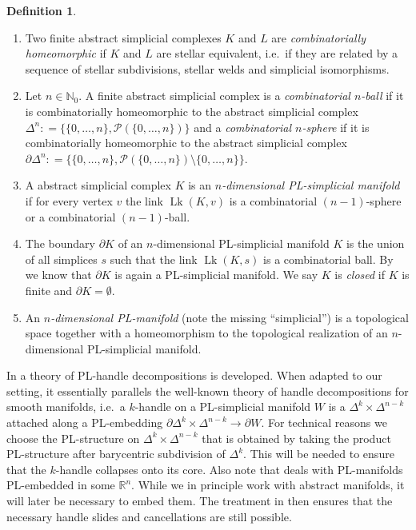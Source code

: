 \documentclass[a4paper, reqno]{amsart}
\theoremstyle{definition}
\newtheorem{definition}[proposition]{Definition}
\theoremstyle{remark}
\newcommand{\N}{\mathbb{N}}
\newcommand{\R}{\mathbb{R}}
\def\op{\operatorname}
\newcommand{\defeq}{\mathrel{\mathop:}=}
\renewcommand{\~}{\nobreak\ }
\begin{document}
\begin{definition}\label{def:combinatorial-manifold}\hfill
\begin{enumerate}
\item Two finite abstract simplicial complexes $K$ and $L$ are \emph{combinatorially homeomorphic} if $K$ and $L$ are stellar equivalent, i.e.\ if they are related by  a sequence of stellar subdivisions, stellar welds and simplicial isomorphisms. 
\item Let $n\in \N_0$. 
 A finite abstract simplicial complex is a 
\emph{combinatorial $n$-ball} if it is combinatorially homeomorphic to the abstract simplicial complex \mbox{$\Delta^n\defeq\{\{0,\dots,n\},\mathcal{P}(\{0,\dots,n\})\}$} and a 
\emph{combinatorial $n$-sphere} if it is combinatorially homeomorphic to the abstract simplicial complex $\partial \Delta^n\defeq\{\{0,\dots,n\},\mathcal{P}(\{0,\dots,n\})\setminus \{0,\dots,n\}\}$. 
\item A abstract simplicial complex $K$ is an \emph{$n$-dimensional \mbox{PL-simplicial} manifold} if for every vertex $v$ the link $\op{Lk}(K,v)$ is a combinatorial $(n-1)$-sphere or a combinatorial $(n-1)$-ball.
\item The boundary $\partial K$ of an $n$-di\-men\-sional PL-simplicial manifold $K$ is the union of all simplices $s$ such that  the link $\op{Lk}(K,s)$ is a combinatorial ball. By \cite[Corollary\~II.4]{Glaser} we know that $\partial K$ is again a PL-simplicial manifold.
We say $K$ is \emph{closed} if $K$ is finite and $\partial K=\emptyset$.
\item An \emph{$n$-dimensional PL-manifold} (note the missing \enquote{simplicial}) is a topological space together with a homeomorphism to the topological realization of an $n$-dimensional PL-simplicial manifold.
\end{enumerate}
\end{definition}




In \cite[Chapter 6]{rourkesandersonnew} a theory of PL-handle decompositions is developed. When adapted to our setting, it essentially parallels the well-known theory of handle decompositions for smooth manifolds, i.e.\ a $k$-handle on a PL-simplicial manifold $W$ is a $\Delta^k\times\Delta^{n-k}$ attached along a \mbox{PL-embedding} $\partial\Delta^k\times\Delta^{n-k}\to\partial W$. For technical reasons we choose the PL-structure on $\Delta^k\times\Delta^{n-k}$ that is obtained by taking the product PL-structure after barycentric subdivision of $\Delta^k$. This will be needed to ensure that the $k$-handle collapses onto its core. Also note that \cite{rourkesandersonnew} deals with PL-manifolds PL-embedded in some $\R^n$. While we in principle work with abstract manifolds, it will later be necessary to embed them. The treatment in \cite{rourkesandersonnew} then ensures that the necessary handle slides and cancellations are still possible.\pagebreak
\end{document}
